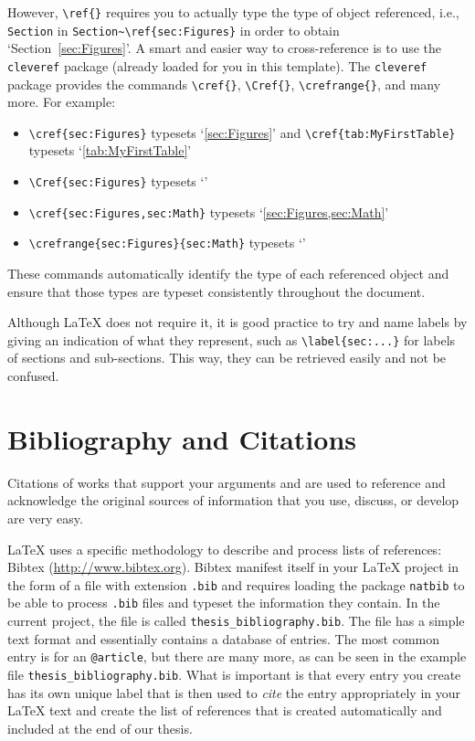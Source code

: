 However, \verb|\ref{}| requires you to actually type the type of object referenced, i.e.,  \verb|Section| in \verb|Section~\ref{sec:Figures}| in order to obtain `Section~\ref{sec:Figures}'. 
A smart and easier way to cross-reference is to use the \verb|cleveref| package (already loaded for you in this template).
The \verb|cleveref| package provides the commands \verb|\cref{}|, \verb|\Cref{}|, \verb|\crefrange{}|, and many more. For example:
\begin{itemize}
    \item \verb|\cref{sec:Figures}| typesets `\cref{sec:Figures}' and \verb|\cref{tab:MyFirstTable}| typesets `\cref{tab:MyFirstTable}'
    \item \verb|\Cref{sec:Figures}| typesets `'
    \item \verb|\cref{sec:Figures,sec:Math}| typesets `\cref{sec:Figures,sec:Math}'
    \item \verb|\crefrange{sec:Figures}{sec:Math}| typesets `'
\end{itemize}
%
These commands automatically identify the type of each referenced object and ensure that those types are typeset consistently throughout the document.

Although \LaTeX{} does not require it, it is good practice to try and name labels by giving an indication of what they represent, such as \verb|\label{sec:...}| for labels of sections and sub-sections.
This way, they can be retrieved easily and not be confused.




\section{Bibliography and Citations}
\label{sec:Bibligraphy}

Citations of works that support your arguments and are used to reference and acknowledge the original sources of information that you use, discuss, or develop are very easy. 

\LaTeX{} uses a specific methodology to describe and process lists of references: Bibtex (\url{http://www.bibtex.org}).
Bibtex manifest itself in your \LaTeX{} project in the form of a file with extension \verb|.bib| and requires loading the package \verb|natbib| to be able to process \verb|.bib| files and typeset the information they contain.
In the current project, the file is called \verb|thesis_bibliography.bib|.
The file has a simple text format and essentially contains a database of entries.
The most common entry is for an \verb|@article|, but there are many more, as can be seen in the example file \verb|thesis_bibliography.bib|. 
What is important is that every entry you create has its own unique label that is then used to \emph{cite} the entry appropriately in your \LaTeX{} text and create the list of references that is created automatically and included at the end of our thesis.

